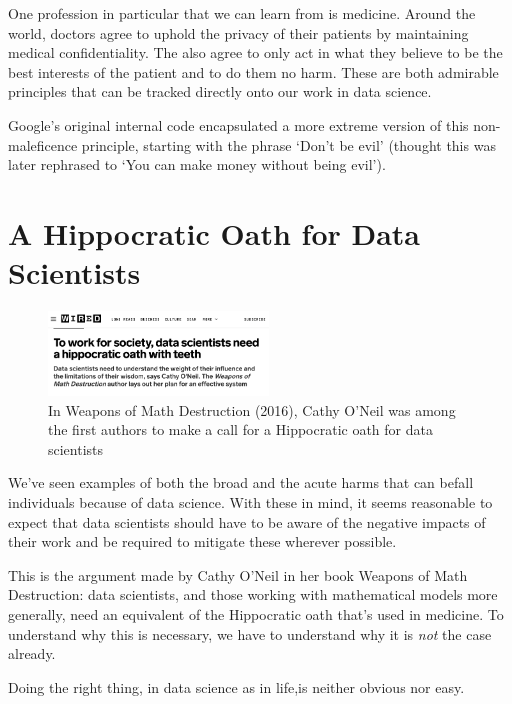 \documentclass[
  letterpaper,
  DIV=11,
  numbers=noendperiod]{scrreprt}
\begin{document}
One profession in particular that we can learn from is medicine. Around
the world, doctors agree to uphold the privacy of their patients by
maintaining medical confidentiality. The also agree to only act in what
they believe to be the best interests of the patient and to do them no
harm. These are both admirable principles that can be tracked directly
onto our work in data science.

Google's original internal code encapsulated a more extreme version of
this non-maleficence principle, starting with the phrase `Don't be evil'
(thought this was later rephrased to `You can make money without being
evil').

\section{A Hippocratic Oath for Data
Scientists}\label{a-hippocratic-oath-for-data-scientists}

\begin{figure}[H]

{\centering \includegraphics[width=2.3in,height=\textheight]{images/503-ethics-conduct/wired-hippocratic.png}

}

\caption{In Weapons of Math Destruction (2016), Cathy O'Neil was among
the first authors to make a call for a Hippocratic oath for data
scientists}

\end{figure}%

We've seen examples of both the broad and the acute harms that can
befall individuals because of data science. With these in mind, it seems
reasonable to expect that data scientists should have to be aware of the
negative impacts of their work and be required to mitigate these
wherever possible.

This is the argument made by Cathy O'Neil in her book Weapons of Math
Destruction: data scientists, and those working with mathematical models
more generally, need an equivalent of the Hippocratic oath that's used
in medicine. To understand why this is necessary, we have to understand
why it is \emph{not} the case already.

Doing the right thing, in data science as in life,is neither obvious nor
easy.
\end{document}
